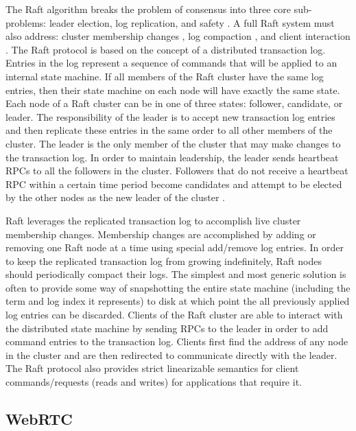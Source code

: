 \documentclass[conference,compsoc]{./IEEEtran/IEEEtran}
\begin{document}
The Raft algorithm breaks the problem of consensus into three core sub-problems: leader election, log replication, and safety \cite[Section~3]{raft_thesis:ongaro14}. A full Raft system must also address: cluster membership changes \cite[Section~4]{raft_thesis:ongaro14}, log compaction \cite[Section~5]{raft_thesis:ongaro14}, and client interaction \cite[Section~6]{raft_thesis:ongaro14}. The Raft protocol is based on the concept of a distributed transaction log. Entries in the log represent a sequence of commands that will be applied to an internal state machine. If all members of the Raft cluster have the same log entries, then their state machine on each node will have exactly the same state. Each node of a Raft cluster can be in one of three states: follower, candidate, or leader. The responsibility of the leader is to accept new transaction log entries and then replicate these entries in the same order to all other members of the cluster. The leader is the only member of the cluster that may make changes to the transaction log. In order to maintain leadership, the leader sends heartbeat RPCs to all the followers in the cluster.  Followers that do not receive a heartbeat RPC within a certain time period become candidates and attempt to be elected by the other nodes as the new leader of the cluster \cite[p.~12]{raft_thesis:ongaro14}.

Raft leverages the replicated transaction log to accomplish live cluster membership changes. Membership changes are accomplished by adding or removing one Raft node at a time using special add/remove log entries. In order to keep the replicated transaction log from growing indefinitely, Raft nodes should periodically compact their logs. The simplest and most generic solution is often to provide some way of snapshotting the entire state machine (including the term and log index it represents) to disk at which point the all previously applied log entries can be discarded. Clients of the Raft cluster are able to interact with the distributed state machine by sending RPCs to the leader in order to add command entries to the transaction log. Clients first find the address of any node in the cluster and are then redirected to communicate directly with the leader. The Raft protocol also provides strict linearizable semantics for client commands/requests (reads and writes) for applications that require it.

\subsection{WebRTC}
\end{document}
